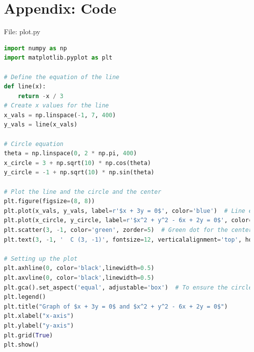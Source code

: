 \documentclass{beamer}
\numberwithin{equation}{section}
\theoremstyle{remark}
\begin{document}
\section*{Appendix: Code}
\begin{frame}[fragile]{File: plot.py}
\begin{lstlisting}[language=Python]
import numpy as np
import matplotlib.pyplot as plt

# Define the equation of the line
def line(x):
    return -x / 3
# Create x values for the line
x_vals = np.linspace(-1, 7, 400)
y_vals = line(x_vals)

# Circle equation
theta = np.linspace(0, 2 * np.pi, 400)
x_circle = 3 + np.sqrt(10) * np.cos(theta)
y_circle = -1 + np.sqrt(10) * np.sin(theta)

# Plot the line and the circle and the center
plt.figure(figsize=(8, 8))
plt.plot(x_vals, y_vals, label=r'$x + 3y = 0$', color='blue')  # Line equation
plt.plot(x_circle, y_circle, label=r'$x^2 + y^2 - 6x + 2y = 0$', color='red')  # Circle equation
plt.scatter(3, -1, color='green', zorder=5)  # Green dot for the center
plt.text(3, -1, '  C (3, -1)', fontsize=12, verticalalignment='top', horizontalalignment='right')

# Setting up the plot
plt.axhline(0, color='black',linewidth=0.5)
plt.axvline(0, color='black',linewidth=0.5)
plt.gca().set_aspect('equal', adjustable='box')  # To ensure the circle looks like a circle
plt.legend()
plt.title("Graph of $x + 3y = 0$ and $x^2 + y^2 - 6x + 2y = 0$")
plt.xlabel("x-axis")
plt.ylabel("y-axis")
plt.grid(True)
plt.show()
\end{lstlisting}
\end{frame}
\end{document}
